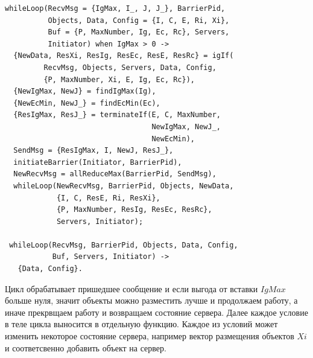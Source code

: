			\begin{lstlisting}
whileLoop(RecvMsg = {IgMax, I_, J, J_}, BarrierPid, 
          Objects, Data, Config = {I, C, E, Ri, Xi},
          Buf = {P, MaxNumber, Ig, Ec, Rc}, Servers,
          Initiator) when IgMax > 0 ->
  {NewData, ResXi, ResIg, ResEc, ResE, ResRc} = igIf(
         RecvMsg, Objects, Servers, Data, Config, 
         {P, MaxNumber, Xi, E, Ig, Ec, Rc}),
  {NewIgMax, NewJ} = findIgMax(Ig),
  {NewEcMin, NewJ_} = findEcMin(Ec),
  {ResIgMax, ResJ_} = terminateIf(E, C, MaxNumber, 
                                  NewIgMax, NewJ_, 
                                  NewEcMin),
  SendMsg = {ResIgMax, I, NewJ, ResJ_},
  initiateBarrier(Initiator, BarrierPid),
  NewRecvMsg = allReduceMax(BarrierPid, SendMsg),
  whileLoop(NewRecvMsg, BarrierPid, Objects, NewData, 
            {I, C, ResE, Ri, ResXi}, 
            {P, MaxNumber, ResIg, ResEc, ResRc}, 
            Servers, Initiator);
  
 whileLoop(RecvMsg, BarrierPid, Objects, Data, Config, 
           Buf, Servers, Initiator) -> 
   {Data, Config}.				
			\end{lstlisting}
			Цикл обрабатывает пришедшее сообщение и если выгода от вставки $IgMax$ больше нуля, значит объекты можно разместить лучше и продолжаем работу, а иначе прекрвщаем работу и возвращаем 
			состояние сервера. Далее каждое условие в теле цикла выносится в отдельную функцию. Каждое из условий может изменить некоторое состояние сервера, например вектор размещения объектов 
			$Xi$ и соответсвенно добавить объект на сервер.

